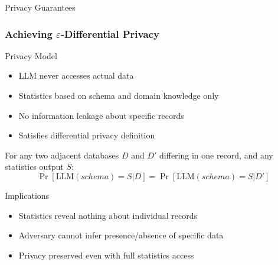 \documentclass{beamer}
\begin{document}
\begin{frame}{Privacy Guarantees}
\frametitle{Achieving $\varepsilon$-Differential Privacy}

\begin{block}{Privacy Model}
\begin{itemize}
    \item LLM never accesses actual data
    \item Statistics based on schema and domain knowledge only
    \item No information leakage about specific records
    \item Satisfies differential privacy definition
\end{itemize}
\end{block}

\begin{theorem}
For any two adjacent databases $D$ and $D'$ differing in one record, and any statistics output $S$:
$$\Pr[\text{LLM}(schema) = S | D] = \Pr[\text{LLM}(schema) = S | D']$$
\end{theorem}

\begin{alertblock}{Implications}
\begin{itemize}
    \item Statistics reveal nothing about individual records
    \item Adversary cannot infer presence/absence of specific data
    \item Privacy preserved even with full statistics access
\end{itemize}
\end{alertblock}

\end{frame}
\end{document}
